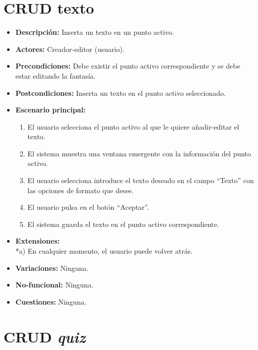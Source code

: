 \section{CRUD texto}
\begin{itemize}
	\item \textbf{Descripción:} Inserta un texto en un punto activo.
	\item \textbf{Actores:} Creador-editor (usuario).
	\item \textbf{Precondiciones:} Debe existir el punto activo correspondiente y se debe estar editando la fantasía.
	\item \textbf{Postcondiciones:} Inserta un texto en el punto activo seleccionado.
	\item \textbf{Escenario principal:}
	\begin{enumerate}
		\item El usuario selecciona el punto activo al que le quiere añadir-editar el texto.
		\item El sistema muestra una ventana emergente con la información del punto activo.
		\item El usuario selecciona introduce el texto deseado en el campo ``Texto'' con las opciones de formato que desee. 
		\item El usuario pulsa en el botón ``Aceptar''.
		\item El sistema guarda el texto en el punto activo correspondiente.
	\end{enumerate}
	\item \textbf{Extensiones:} \\ *a) En cualquier momento, el usuario puede volver atrás.
	\item \textbf{Variaciones:} Ninguna.
	\item \textbf{No-funcional:} Ninguna.
	\item \textbf{Cuestiones:} Ninguna.
\end{itemize}

\section{CRUD \textit{quiz}}
\hypertarget{crearquiz}{}
